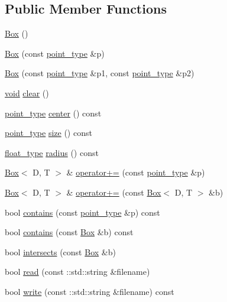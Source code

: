 \subsection*{Public Member Functions}
\begin{DoxyCompactItemize}
\item 
\hyperlink{classtrimesh_1_1Box_af7a91b84e4bcb2dabc6b94ef2a2872a1}{Box} ()
\item 
\hyperlink{classtrimesh_1_1Box_ac89db794c58d514ace2230361499352f}{Box} (const \hyperlink{classtrimesh_1_1Box_a208c806781f96a7001491a275dfa7655}{point\+\_\+type} \&p)
\item 
\hyperlink{classtrimesh_1_1Box_a42a3734ab4a5dd6107e1ba609b7b3911}{Box} (const \hyperlink{classtrimesh_1_1Box_a208c806781f96a7001491a275dfa7655}{point\+\_\+type} \&p1, const \hyperlink{classtrimesh_1_1Box_a208c806781f96a7001491a275dfa7655}{point\+\_\+type} \&p2)
\item 
\hyperlink{namespacetrimesh_a784ddfd979e1c579bda795a8edfc3f43}{void} \hyperlink{classtrimesh_1_1Box_aff5802052cfb630fa70815659a37384e}{clear} ()
\item 
\hyperlink{classtrimesh_1_1Box_a208c806781f96a7001491a275dfa7655}{point\+\_\+type} \hyperlink{classtrimesh_1_1Box_a39edf4c682b2b1d8b8526124efa74413}{center} () const
\item 
\hyperlink{classtrimesh_1_1Box_a208c806781f96a7001491a275dfa7655}{point\+\_\+type} \hyperlink{classtrimesh_1_1Box_a111c09e2c3fb2b350e9091eb6e61d641}{size} () const
\item 
\hyperlink{classtrimesh_1_1Box_aa3a7238ce00e96ceaf24ecbb1077b7a4}{float\+\_\+type} \hyperlink{classtrimesh_1_1Box_ae42a8b9c88800f8688495390b2452135}{radius} () const
\item 
\hyperlink{classtrimesh_1_1Box}{Box}$<$ D, T $>$ \& \hyperlink{classtrimesh_1_1Box_a7cfdd9e833ffd23d6dacd0dd0de83728}{operator+=} (const \hyperlink{classtrimesh_1_1Box_a208c806781f96a7001491a275dfa7655}{point\+\_\+type} \&p)
\item 
\hyperlink{classtrimesh_1_1Box}{Box}$<$ D, T $>$ \& \hyperlink{classtrimesh_1_1Box_ab62681c3d2495c4acd1b77be635813a6}{operator+=} (const \hyperlink{classtrimesh_1_1Box}{Box}$<$ D, T $>$ \&b)
\item 
bool \hyperlink{classtrimesh_1_1Box_abed49b215db7d2affea33694a82327d4}{contains} (const \hyperlink{classtrimesh_1_1Box_a208c806781f96a7001491a275dfa7655}{point\+\_\+type} \&p) const
\item 
bool \hyperlink{classtrimesh_1_1Box_a8846c5b376e879c540e65e128e372cf2}{contains} (const \hyperlink{classtrimesh_1_1Box}{Box} \&b) const
\item 
bool \hyperlink{classtrimesh_1_1Box_a517e3bf133bf9d42e9ef70f078596764}{intersects} (const \hyperlink{classtrimesh_1_1Box}{Box} \&b)
\item 
bool \hyperlink{classtrimesh_1_1Box_aa4e1ce7bc178d938a7f93d7a6d517796}{read} (const \+::std\+::string \&filename)
\item 
bool \hyperlink{classtrimesh_1_1Box_a3520a4a6df05071e821bf63cb18d789f}{write} (const \+::std\+::string \&filename) const
\end{DoxyCompactItemize}
